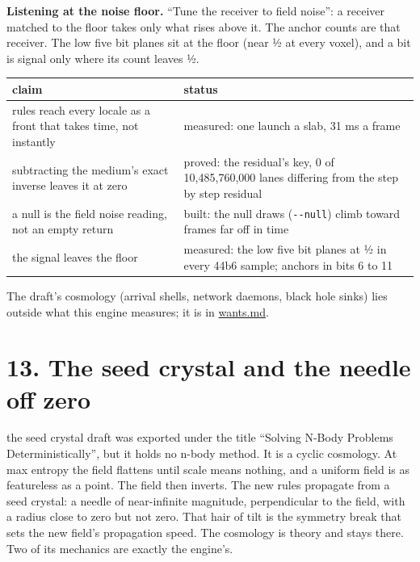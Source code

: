 \textbf{Listening at the noise floor.} “Tune the receiver to field noise”: a receiver matched to the floor takes only what rises above it. The anchor counts are that receiver. The low five bit planes sit at the floor (near ½ at every voxel), and a bit is signal only where its count leaves ½.

{\small
\setlength{\tabcolsep}{6pt}
\begin{longtable}{>{\RaggedRight\arraybackslash}p{}>{\RaggedRight\arraybackslash}p{}}
\toprule
claim & status \\
\midrule
\endhead
rules reach every locale as a front that takes time, not instantly & measured: one launch a slab, 31 ms a frame \\
subtracting the medium's exact inverse leaves it at zero & proved: the residual's key, 0 of 10,485,760,000 lanes differing from the step by step residual \\
a null is the field noise reading, not an empty return & built: the null draws (\texttt{-\allowbreak{}-\allowbreak{}null}) climb toward frames far off in time \\
the signal leaves the floor & measured: the low five bit planes at ½ in every 44b6 sample; anchors in bits 6 to 11 \\
\bottomrule
\end{longtable}
}

The draft's cosmology (arrival shells, network daemons, black hole sinks) lies outside what this engine measures; it is in \hyperref[chap:wants]{wants.md}.

\section{\texorpdfstring{13. The seed crystal and the needle off zero}{13. The seed crystal and the needle off zero}}

the seed crystal draft was exported under the title “Solving N-Body Problems Deterministically”, but it holds no n-body method. It is a cyclic cosmology. At max entropy the field flattens until scale means nothing, and a uniform field is as featureless as a point. The field then inverts. The new rules propagate from a seed crystal: a needle of near-infinite magnitude, perpendicular to the field, with a radius close to zero but not zero. That hair of tilt is the symmetry break that sets the new field's propagation speed. The cosmology is theory and stays there. Two of its mechanics are exactly the engine's.

